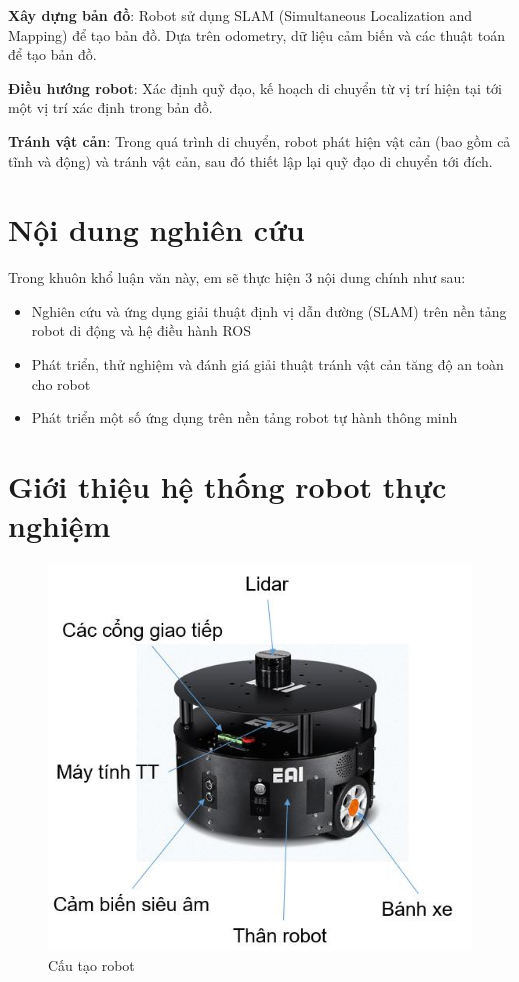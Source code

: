 \textbf{Xây dựng bản đồ}: Robot sử dụng SLAM (Simultaneous Localization and Mapping) để tạo bản đồ. Dựa trên odometry, dữ liệu cảm biến và các thuật toán để tạo bản đồ.

\textbf{Điều hướng robot}: Xác định quỹ đạo, kế hoạch di chuyển từ vị trí hiện tại tới một vị trí xác định trong bản đồ.

\textbf{Tránh vật cản}: Trong quá trình di chuyển, robot phát hiện vật cản (bao gồm cả tĩnh và động) và tránh vật cản, sau đó thiết lập lại quỹ đạo di chuyển tới đích.


\section{Nội dung nghiên cứu}

Trong khuôn khổ luận văn này, em sẽ thực hiện 3 nội dung chính như sau:
\begin{itemize}
	\item Nghiên cứu và ứng dụng giải thuật định vị dẫn đường (SLAM) trên nền tảng robot di động và hệ điều hành ROS
	\item Phát triển, thử nghiệm và đánh giá giải thuật tránh vật cản tăng độ an toàn cho robot
	\item Phát triển một số ứng dụng trên nền tảng robot tự hành thông minh
\end{itemize}

\section{Giới thiệu hệ thống robot thực nghiệm}
\begin{figure}[tph]
	\centering
	\includegraphics[width=0.7\linewidth]{chapter1/figs/eaiD1}
	\caption{Cấu tạo robot}
	\label{fig:eaid1}
\end{figure}

